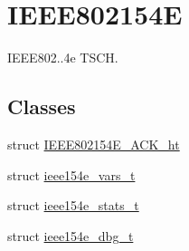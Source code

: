 \hypertarget{group___i_e_e_e802154_e}{}\section{I\+E\+E\+E802154E}
\label{group___i_e_e_e802154_e}


I\+E\+E\+E802..\+4e T\+S\+CH.  


\subsection*{Classes}
\begin{DoxyCompactItemize}
\item 
struct \hyperlink{struct_i_e_e_e802154_e___a_c_k__ht}{I\+E\+E\+E802154\+E\+\_\+\+A\+C\+K\+\_\+ht}
\item 
struct \hyperlink{structieee154e__vars__t}{ieee154e\+\_\+vars\+\_\+t}
\item 
struct \hyperlink{structieee154e__stats__t}{ieee154e\+\_\+stats\+\_\+t}
\item 
struct \hyperlink{structieee154e__dbg__t}{ieee154e\+\_\+dbg\+\_\+t}
\end{DoxyCompactItemize}
